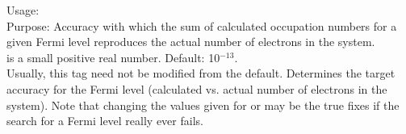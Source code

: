 {
  \noindent
  Usage:   \\[1.0ex]
  Purpose: Accuracy with which the sum of calculated occupation numbers for a
    given Fermi level reproduces the actual number of electrons in the system.
    \\[1.0ex]
   is a small positive real number. Default: 10$^{-13}$. \\
}
Usually, this tag need not be modified from the default. Determines the target
accuracy for the Fermi level (calculated vs. actual number of electrons in the
system). Note that changing the values given for  or
 may be the true fixes if the search for a Fermi level
really ever fails.

